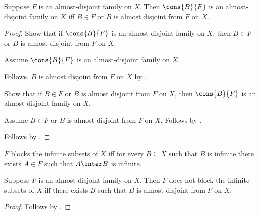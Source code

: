 \begin{theorem}\label{almost_disjoint_cons_iff}
    Suppose $F$ is an almost-disjoint family on $X$.
    Then $\cons{B}{F}$ is an almost-disjoint family on $X$ iff
        $B\in F$ or
        $B$ is almost disjoint from $F$ on $X$.
\end{theorem}
\begin{proof}
    Show that if $\cons{B}{F}$ is an almost-disjoint family
        on $X$, then $B\in F$ or
        $B$ is almost disjoint from $F$ on $X$.
    \begin{subproof}
        Assume $\cons{B}{F}$ is an almost-disjoint family
            on $X$.
        \begin{byCase}
                Follows.
                $B$ is almost disjoint from $F$ on $X$
                    by .
        \end{byCase}
    \end{subproof}
    Show that if $B\in F$ or
        $B$ is almost disjoint from $F$ on $X$, then
        $\cons{B}{F}$ is an almost-disjoint family on $X$.
    \begin{subproof}
        Assume $B\in F$ or
            $B$ is almost disjoint from $F$ on $X$.
        Follows by
            .
    \end{subproof}
    Follows by \auto.
\end{proof}

\begin{definition}\label{blocks_infinite_subsets_of}
    $F$ blocks the infinite subsets of $X$ iff
        for every $B\subseteq X$ such that $B$ is infinite
        there exists $A\in F$ such that $A\inter B$ is infinite.
\end{definition}

\begin{theorem}\label{not_blocking_iff_almost_disjoint_witness}
    Suppose $F$ is an almost-disjoint family on $X$.
    Then $F$ does not block the infinite subsets of $X$ iff
        there exists $B$ such that
            $B$ is almost disjoint from $F$ on $X$.
\end{theorem}
\begin{proof}
    Follows by
        .
\end{proof}
